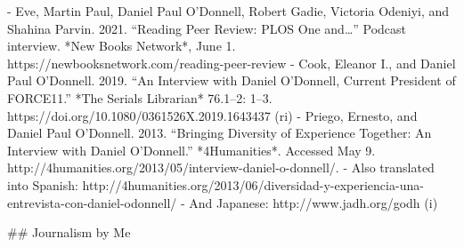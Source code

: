 - Eve, Martin Paul, Daniel Paul O’Donnell, Robert Gadie\*, Victoria Odeniyi\*, and Shahina Parvin\*. 2021. “Reading Peer Review: PLOS One and…” Podcast interview. *New Books Network*, June 1. https:/\allowbreak{}/\allowbreak{}newbooksnetwork.com/\allowbreak{}reading-peer-review
- Cook, Eleanor I., and Daniel Paul O’Donnell. 2019. “An Interview with Daniel O’Donnell, Current President of FORCE11.” *The Serials Librarian* 76.1–2: 1–3. https:/\allowbreak{}/\allowbreak{}doi.org/\allowbreak{}10.1080/\allowbreak{}0361526X.2019.1643437 (ri)
- Priego, Ernesto, and Daniel Paul O’Donnell. 2013. “Bringing Diversity of Experience Together: An Interview with Daniel O’Donnell.” *4Humanities*. Accessed May 9. http:/\allowbreak{}/\allowbreak{}4humanities.org/\allowbreak{}2013/\allowbreak{}05/\allowbreak{}interview-daniel-o-donnell/\allowbreak{}.
  - Also translated into Spanish: http:/\allowbreak{}/\allowbreak{}4humanities.org/\allowbreak{}2013/\allowbreak{}06/\allowbreak{}diversidad-y-experiencia-una-entrevista-con-daniel-odonnell/\allowbreak{}
  - And Japanese: http:/\allowbreak{}/\allowbreak{}www.jadh.org/\allowbreak{}godh (i)

\sectionbreak{}
## Journalism by Me

